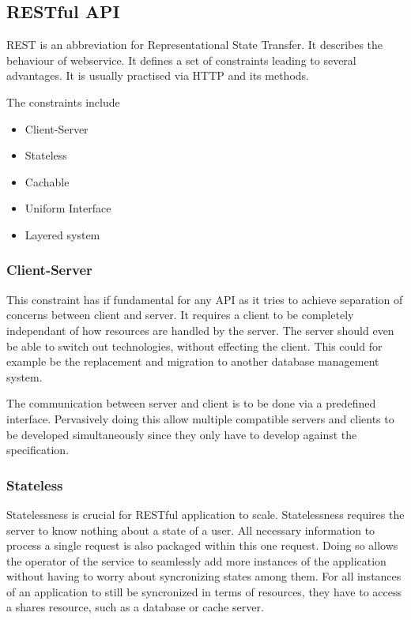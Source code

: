 \subsection{RESTful API}

REST is an abbreviation for Representational State Transfer. It describes the
behaviour of webservice. It defines a set of constraints leading to several
advantages. It is usually practised via HTTP and its methods.

The constraints include

\begin{itemize}
  \item{Client-Server}
  \item{Stateless}
  \item{Cachable}
  \item{Uniform Interface}
  \item{Layered system}
\end{itemize}

\subsubsection{Client-Server}

This constraint has if fundamental for any API as it tries to achieve
separation of concerns between client and server. It requires a client to be
completely independant of how resources are handled by the server. The server
should even be able to switch out technologies, without effecting the client.
This could for example be the replacement and migration to another database
management system.

The communication between server and client is to be done via a predefined
interface. Pervasively doing this allow multiple compatible servers and clients
to be developed simultaneously since they only have to develop against the
specification.

\subsubsection{Stateless}

Statelessness is crucial for RESTful application to scale. Statelessness
requires the server to know nothing about a state of a user. All necessary
information to process a single request is also packaged within this one
request. Doing so allows the operator of the service to seamlessly add more
instances of the application without having to worry about syncronizing states
among them. For all instances of an application to still be syncronized in
terms of resources, they have to access a shares resource, such as a database
or cache server.

